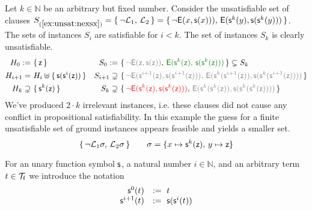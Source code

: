 \begin{example}\label{ex:unsat:nexsx}
	Let $k\in\mathbb{N}$ be an arbitrary but fixed number.
	Consider the unsatisfiable set of clauses
	$S_{(\ref{ex:unsat:nexsx})} = \{\, \lnot{\mathcal L}_1,\,{\mathcal L}_2\, \} =
	\{\,
	{ \lnot{\mathsf{E}}(x, {\mathsf s}(x)))},\, 
	{ {\mathsf{E}}({\mathsf s}^{k}(y), {\mathsf s}({\mathsf s}^{k}(y)))}
	\,\}$.
	The sets of instances $S_i$ are satisfiable for $i<k$.
	The set of instances $S_{k}$ is clearly unsatisfiable.
	\begin{align*}
	H_{0} :=&\ \{\,\mzero\,\} 
	&
	S_{0} :=&\ \{\, 
	{\colG \lnot\mE(\mzero,\msucc(\mzero))},\,
	{\colHi \mE(\ms^k(\mzero),\,\ms(\ms^k(\mzero)))}
	\,\}
	\subsetneq S_k
	\\
	H_{i+1} =&\ H_i\disjointunion\{\,\msucc(\msucc^{i}(\mzero))\,\}
	&
	S_{i+1} \supsetneq&\
	\{\,
	{\colG \lnot\mE(\msucc^{i+1}(\mzero),\msucc(\msucc^{i+1}(\mzero))),\,
	\mE(\ms^k(\msucc^{i+1}(\mzero)), \ms(\ms^k(\msucc^{i+1}(\mzero))))}
	\,\}
	\\
	H_{k} \supsetneq&\ \{\,\msucc^{k}(\mzero)\,\} 
	&
	S_{k} \supsetneq&\
	\{\,
	{\colLo \lnot\mE(\msucc^{k}(\mzero),\msucc(\msucc^{k}(\mzero)))},\,
	{\colG\mE(\ms^k(\msucc^{k}(\mzero)), \ms(\ms^k(\msucc^{k}(\mzero))))}
	\,\}
	\end{align*}
	We've produced $2\cdot k$ {\myem irrelevant} instances, i.e. these clauses did not cause any conflict in 
	propositional satisfiability. 
	In this example the guess for a finite unsatisfiable set of ground instances appears feasible and yields a smaller set.
	\[
	\{\, 
	\lnot{\mathcal L}_1\sigma,\,{\mathcal L}_2\sigma
	\,\} \qquad \sigma=\{x\mapsto {\mathsf s}^k({\mathsf z}),\,y\mapsto {\mathsf z}\}
	\]
\end{example}

\begin{definition}
	For an unary function symbol ${\mathsf s}$, a natural number
	$i\in\mathbb{N}$, and an arbitrary term $t\in{\mathcal T}_{\mathsf f}$ we introduce the notation
	\[
	\begin{array}{rl}
	{\mathsf s}^0(t) &:=\ t \\
	{\mathsf s}^{i+1}(t) &:=\ {\mathsf s}({\mathsf s}^i(t))
	\end{array}
	\]
\end{definition}



